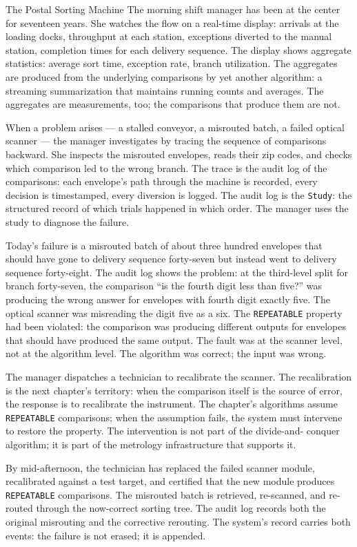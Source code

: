 \begin{coda}{The Postal Sorting Machine}
The morning shift manager has been at the center for seventeen years.
She watches the flow on a real-time display: arrivals at the loading
docks, throughput at each station, exceptions diverted to the manual
station, completion times for each delivery sequence. The display
shows aggregate statistics: average sort time, exception rate, branch
utilization. The aggregates are produced from the underlying
comparisons by yet another algorithm: a streaming summarization that
maintains running counts and averages. The aggregates are
measurements, too; the comparisons that produce them are not.

When a problem arises --- a stalled conveyor, a misrouted batch, a
failed optical scanner --- the manager investigates by tracing the
sequence of comparisons backward. She inspects the misrouted
envelopes, reads their zip codes, and checks which comparison led to
the wrong branch. The trace is the audit log of the comparisons: each
envelope's path through the machine is recorded, every decision is
timestamped, every diversion is logged. The audit log is the
\texttt{Study}: the structured record of which trials happened in
which order. The manager uses the study to diagnose the failure.

Today's failure is a misrouted batch of about three hundred envelopes
that should have gone to delivery sequence forty-seven but instead
went to delivery sequence forty-eight. The audit log shows the
problem: at the third-level split for branch forty-seven, the
comparison ``is the fourth digit less than five?'' was producing the
wrong answer for envelopes with fourth digit exactly five. The
optical scanner was misreading the digit five as a six. The
\texttt{REPEATABLE} property had been violated: the comparison was
producing different outputs for envelopes that should have produced
the same output. The fault was at the scanner level, not at the
algorithm level. The algorithm was correct; the input was wrong.

The manager dispatches a technician to recalibrate the scanner. The
recalibration is the next chapter's territory: when the comparison
itself is the source of error, the response is to recalibrate the
instrument. The chapter's algorithms assume \texttt{REPEATABLE}
comparisons; when the assumption fails, the system must intervene to
restore the property. The intervention is not part of the divide-and-
conquer algorithm; it is part of the metrology infrastructure that
supports it.

By mid-afternoon, the technician has replaced the failed scanner
module, recalibrated against a test target, and certified that the
new module produces \texttt{REPEATABLE} comparisons. The misrouted
batch is retrieved, re-scanned, and re-routed through the now-correct
sorting tree. The audit log records both the original misrouting and
the corrective rerouting. The system's record carries both events:
the failure is not erased; it is appended.


\end{coda}
